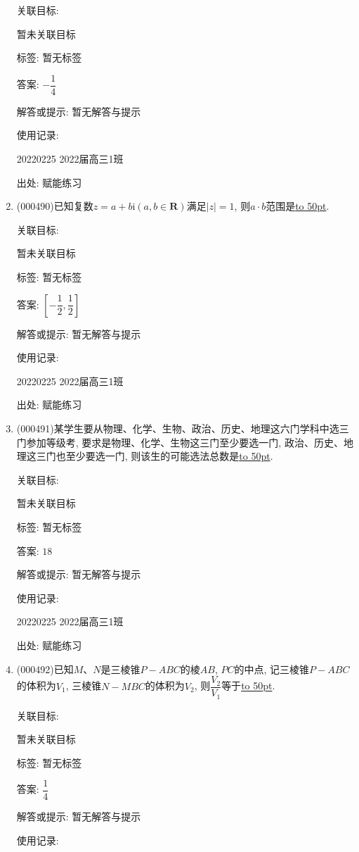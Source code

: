 \documentclass[10pt,a4paper]{article}
\newcommand{\blank}[1]{\underline{\hbox to #1pt{}}}
\begin{document}
\begin{enumerate}[1.]
关联目标:

暂未关联目标



标签: 暂无标签

答案: $-\dfrac 14$

解答或提示: 暂无解答与提示

使用记录:

20220225	2022届高三1班	


出处: 赋能练习
\item { (000490)}已知复数$z=a+b\mathrm{i}(a,b\in \mathbf{R})$满足$|z|=1$, 则$a\cdot b$范围是\blank{50}.


关联目标:

暂未关联目标



标签: 暂无标签

答案: $[ -\dfrac 12,  \dfrac 12  ]$

解答或提示: 暂无解答与提示

使用记录:

20220225	2022届高三1班	


出处: 赋能练习
\item { (000491)}某学生要从物理、化学、生物、政治、历史、地理这六门学科中选三门参加等级考, 要求是物理、化学、生物这三门至少要选一门, 政治、历史、地理这三门也至少要选一门, 则该生的可能选法总数是\blank{50}.


关联目标:

暂未关联目标



标签: 暂无标签

答案: $18$

解答或提示: 暂无解答与提示

使用记录:

20220225	2022届高三1班	


出处: 赋能练习
\item { (000492)}已知$M$、$N$是三棱锥$P-ABC$的棱$AB$, $PC$的中点, 记三棱锥$P-ABC$的体积为$V_1$, 三棱锥$N-MBC$的体积为$V_2$, 则$\dfrac{V_2}{V_1}$等于\blank{50}.


关联目标:

暂未关联目标



标签: 暂无标签

答案: $\dfrac 14$

解答或提示: 暂无解答与提示

使用记录:


\end{enumerate}
\end{document}
